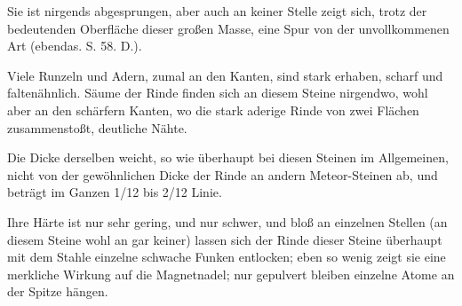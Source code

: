 \documentclass[a4paper, 11pt, oneside, german]{article}
\begin{document}
Sie ist nirgends abgesprungen, aber auch an keiner Stelle zeigt sich, trotz der bedeutenden Oberfläche dieser großen Masse, eine Spur von der unvollkommenen Art (ebendas. S. 58. D.).

Viele Runzeln und Adern, zumal an den Kanten, sind stark erhaben, scharf und faltenähnlich. Säume der Rinde finden sich an diesem Steine nirgendwo, wohl aber an den schärfern Kanten, wo die stark aderige Rinde von zwei Flächen zusammenstoßt, deutliche Nähte.

Die Dicke derselben weicht, so wie überhaupt bei diesen Steinen im Allgemeinen, nicht von der gewöhnlichen Dicke der Rinde an andern Meteor-Steinen ab, und beträgt im Ganzen 1/12 bis 2/12 Linie.

Ihre Härte ist nur sehr gering, und nur schwer, und bloß an einzelnen Stellen (an diesem Steine wohl an gar keiner) lassen sich der Rinde dieser Steine überhaupt mit dem Stahle einzelne schwache Funken entlocken; eben so wenig zeigt sie eine merkliche Wirkung auf die Magnetnadel; nur gepulvert bleiben einzelne Atome an der Spitze hängen.
\end{document}
